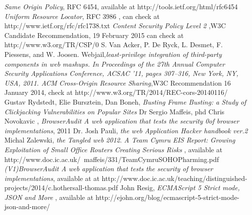 \documentclass[a4paper,12pt]{report}
\begin{document}
\begin{thebibliography}{1}
  \emph {Same Origin Policy}, RFC 6454, available at  http://tools.ietf.org/html/rfc6454
  \emph{Uniform Resource Locator}, RFC 3986 , can check at http://www.ietf.org/rfc/rfc1738.txt
  \emph{Content Security Policy Level 2} ,W3C Candidate Recommendation, 19 February 2015 can check at http://www.w3.org/TR/CSP/0
  S. Van Acker, P. De Ryck, L. Desmet, F. Piessens, and W. Joosen. Webjail,\emph {least-privilege integration of third-party components in web mashups. In Proceedings of the 27th Annual Computer Security
Applications Conference, ACSAC ’11, pages 307–316, New York, NY, USA, 2011. ACM}
 \emph{Cross-Origin Resource Sharing},W3C Recommendation 16 January 2014, check at http://www.w3.org/TR/2014/REC-cors-20140116/
  Gustav Rydstedt, Elie Bursztein, Dan Boneh, \emph{Busting Frame Busting: a Study of Clickjacking Vulnerabilities on Popular Sites} 
  Dr Sergio Maffeis, phd Chris Novokavic , \emph{BrowserAudit A web application that tests the security 0of browser implementations}, 2011
  Dr. Josh Pauli, \emph{the web Application Hacker handbook ver.2}
  Michal Zalewski, \emph{the Tangled web 2012}.
  \emph{ A Team Cymru EIS Report: Growing Exploitation of Small Office Routers Creating Serious Risks} , available at http://www.doc.ic.ac.uk/~maffeis/331/TeamCymruSOHOPharming.pdf
  \emph {(V1)BrowserAudit A web application that tests the security of browser implementations}, available at at http://www.doc.ic.ac.uk/teaching/distinguished-projects/2014/c.hothersall-thomas.pdf
  John Resig, \emph {ECMAScript 5 Strict mode, JSON and More} , available at http://ejohn.org/blog/ecmascript-5-strict-mode-json-and-more/
 \end{thebibliography}
\end{document}
